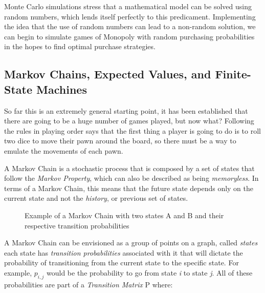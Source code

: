 \documentclass{article}
\begin{document}
Monte Carlo simulations stress that a mathematical model can be solved using random numbers, which lends itself perfectly to this predicament.\cite{montecarlo}  Implementing the idea that the use of random numbers can lead to a non-random solution, we can begin to simulate games of Monopoly with random purchasing probabilities in the hopes to find optimal purchase strategies.

\subsection{Markov Chains, Expected Values, and Finite-State Machines}

So far this is an extremely general starting point, it has been established that there are going to be a huge number of games played, but now what?  Following the rules in playing order says that the first thing a player is going to do is to roll two dice to move their pawn around the board, so there must be a way to emulate the movements of each pawn.

A Markov Chain is a stochastic process that is composed by a set of states that follow the \textit{Markov Property}, which can also be described as being \textit{memoryless}.  In terms of a Markov Chain, this means that the future state depends only on the current state and not the \textit{history}, or previous set of states.\cite{montecarlo}

\begin{figure}
\begin{center}
\caption{Example of a Markov Chain with two states A and B and their respective transition probabilities}
\label{fig:figure3}
\end{center}
\end{figure}

A Markov Chain can be envisioned as a group of points on a graph, called \textit{states} each state has \textit{transition probabilities} associated with it that will dictate the probability of transitioning from the current state to the specific state.  For example,  $p_{i,j}$ would be the probability to go from state \textit{i} to state \textit{j}.  All of these probabilities are part of a \textit{Transition Matrix}  P\cite{montecarlo} where:
\end{document}
